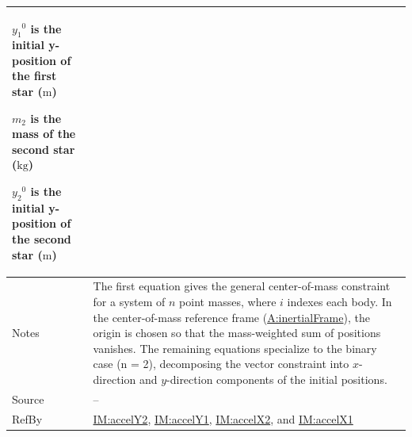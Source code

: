 \documentclass[12pt]{article}
\begin{document}
\begin{minipage}{\textwidth}
\begin{tabular}{>{\raggedright}p{}>{\raggedright\arraybackslash}p{}}
\begin{symbDescription}
              \item{${{y_{1}}^{0}}$ is the initial y-position of the first star (${\text{m}}$)}
              \item{${m_{2}}$ is the mass of the second star (${\text{kg}}$)}
              \item{${{y_{2}}^{0}}$ is the initial y-position of the second star (${\text{m}}$)}
              \end{symbDescription}
\\ \midrule
Notes & The first equation gives the general center-of-mass constraint for a system of $n$ point masses, where $i$ indexes each body. In the center-of-mass reference frame (\hyperref[inertialFrame]{A:inertialFrame}), the origin is chosen so that the mass-weighted sum of positions vanishes. The remaining equations specialize to the binary case (n = 2), decomposing the vector constraint into $x$-direction and $y$-direction components of the initial positions.
        
\\ \midrule
Source & --
         
\\ \midrule
RefBy & \hyperref[IM:accelY2]{IM:accelY2}, \hyperref[IM:accelY1]{IM:accelY1}, \hyperref[IM:accelX2]{IM:accelX2}, and \hyperref[IM:accelX1]{IM:accelX1}
        
\\ \bottomrule
\end{tabular}
\end{minipage}
\end{document}
